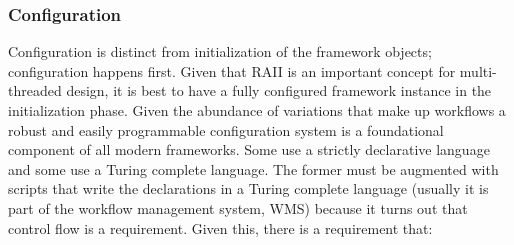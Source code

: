\documentclass[../main-v1.tex]{subfiles}
\begin{document}
\subsubsection{Configuration}

Configuration is distinct from initialization of the framework objects; configuration happens first.  Given that RAII is an important concept for multi-threaded design, it is best to have a fully configured framework instance in the initialization phase.  Given the abundance of variations that make up  workflows a robust and easily programmable configuration system is a foundational component of all modern frameworks.  Some use a strictly declarative language and some use a Turing complete language.  The former must be augmented with scripts that write the declarations in a Turing complete language (usually it is part of the workflow management system, WMS) because it turns out that control flow is a requirement.  Given this, there is a requirement that:
\end{document}
